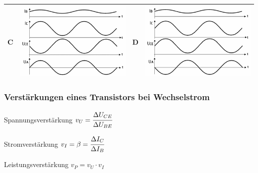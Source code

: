 \begin{frame}
\begin{tabular}{p{2.5pc}||l||p{2.5pc}||l}
    C & \includegraphics[width=.25\textwidth,height=.25\textheight,keepaspectratio]{a06/tc626d.png} &
    D & \includegraphics[width=.25\textwidth,height=.25\textheight,keepaspectratio]{a06/tc626b.png} \\ \hline
  \end{tabular}
\end{frame}

\begin{frame}
	\frametitle{Verstärkungen eines Transistors bei Wechselstrom}
	\centering
	\begin{block}{Spannungsverstärkung}
	  $v_U = \cfrac{\Delta U_{CE}}{\Delta U_{BE}}$
	\end{block}

	\begin{block}{Stromverstärkung}
	  $v_I = \beta = \cfrac{\Delta I_C}{\Delta I_B}$
	\end{block}

	\begin{block}{Leistungsverstärkung}
	  $v_P = v_U \cdot v_I$
	\end{block}
\end{frame}


